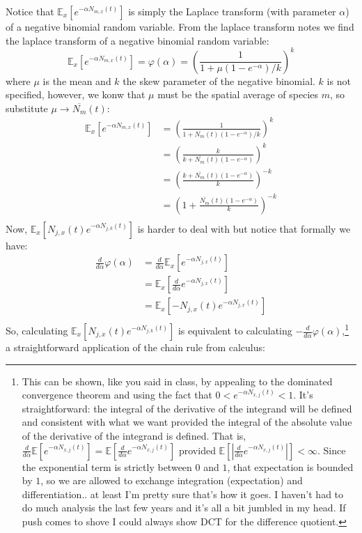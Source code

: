 \documentclass[11pt]{amsart}
\newcommand\Ex[0]{\mathbb{E}_x}
\begin{document}
Notice that $\Ex[e^{-\alpha N_{m,x}(t)}]$ is simply the Laplace transform (with parameter $\alpha$) of a negative binomial random variable.  From the laplace transform notes we find the laplace transform of a negative binomial random variable:
\[
\Ex[e^{-\alpha N_{m,x}(t)}]=\varphi(\alpha)=\left(\frac{1}{1+\mu(1-e^{-\alpha})/k}\right)^k
\]
where $\mu$ is the mean and $k$ the skew parameter of the negative binomial.  $k$ is not specified, however, we konw that $\mu$ must be the spatial average of species $m$, so substitute $\mu \to \overline{N_m}(t)$:
\begin{align*}
\Ex[e^{-\alpha N_{m,x}(t)}] &= \left(\frac{1}{1+\overline{N_m}(t)(1-e^{-\alpha})/k}\right)^k\\
&= \left(\frac{k}{k+\overline{N_m}(t)(1-e^{-\alpha})}\right)^k\\
&= \left(\frac{k+\overline{N_m}(t)(1-e^{-\alpha})}{k}\right)^{-k}\\
&= \left(1+\frac{\overline{N_m}(t)(1-e^{-\alpha})}{k}\right)^{-k}\\
\end{align*}
Now, $\Ex[N_{j,x}(t)e^{-\alpha N_{j,k}(t)}]$ is harder to deal with but notice that formally we have:
\begin{align*}
\frac{d}{d\alpha}\varphi(\alpha) &= \frac{d}{d\alpha}\Ex[e^{-\alpha N_{j,x}(t)}]\\
&=\Ex\left[\frac{d}{d\alpha}e^{-\alpha N_{j,x}(t)}\right]\\
&=\Ex\left[-N_{j,x}(t)e^{-\alpha N_{j,x}(t)}\right]\\
\end{align*}
So, calculating $\Ex[N_{j,x}(t)e^{-\alpha N_{j,k}(t)}]$ is equivalent to calculating $-\frac{d}{d\alpha}\varphi(\alpha)$,\footnote{This can be shown, like you said in class, by appealing to the dominated convergence theorem and using the fact that $0<e^{-\alpha N_{x,j}(t)}<1$. It's straightforward: the integral of the derivative of the integrand will be defined and consistent with what we want provided the integral of the absolute value of the derivative of the integrand is defined.  That is, $\frac{d}{d\alpha}\mathbb{E}[e^{-\alpha N_{x,j}(t)}] = \mathbb{E}[\frac{d}{d\alpha}e^{-\alpha N_{x,j}(t)}]$ provided $\mathbb{E}[|\frac{d}{d\alpha}e^{-\alpha N_{x,j}(t)}|]<\infty$.  Since the exponential term is strictly between $0$ and $1$, that expectation is bounded by $1$, so we are allowed to exchange integration (expectation) and differentiation.. at least I'm pretty sure that's how it goes.  I haven't had to do much analysis the last few years and it's all a bit jumbled in my head.  If push comes to shove I could always show DCT for the difference quotient.} a straightforward application of the chain rule from calculus:
\end{document}
